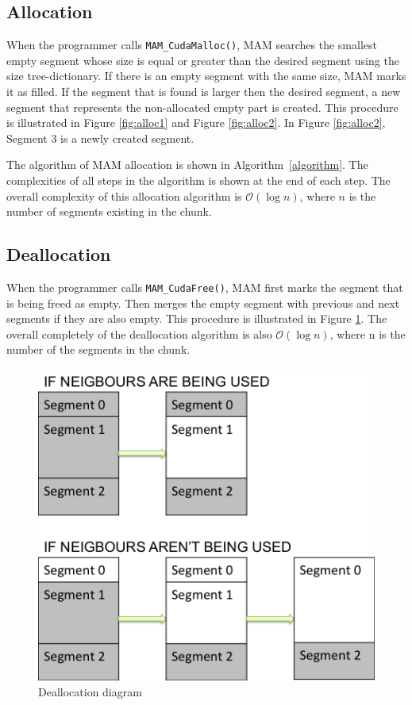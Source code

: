 \documentclass[conference]{IEEEtran}
\def\code#1{\texttt{#1}}
\begin{document}
\subsection{Allocation}
When the programmer calls \code{MAM\_CudaMalloc()}, MAM searches the smallest empty segment whose size is equal or greater than the desired segment using the size tree-dictionary. If there is an empty segment with the same size, MAM marks it as filled. If the segment that is found is larger then the desired segment, a new segment that represents the non-allocated empty part is created. This procedure is illustrated in Figure \ref{fig:alloc1} and Figure \ref{fig:alloc2}. In Figure \ref{fig:alloc2}, Segment 3 is a newly created segment. 




The algorithm of MAM allocation is shown in Algorithm~\ref{algorithm}. 
The complexities of all steps in the algorithm is shown at the end of each step. The overall complexity of this allocation algorithm is $\mathcal{O}(\log n)$, where $n$ is the number of segments existing in the chunk. 

          





\subsection{Deallocation}
When the programmer calls \code{MAM\_CudaFree()}, MAM first marks the segment that is being freed as empty. Then merges the empty segment with previous and next segments if they are also empty. This procedure is illustrated in Figure \ref{fig:dealloc}. %
The overall completely of the deallocation algorithm is also $\mathcal{O}(\log n)$, where n is the number of the segments in the chunk. 


\begin{figure}[h!]
\centering
  \includegraphics[width=0.75\linewidth]{deallocation/deallocation.png}
  \caption{Deallocation diagram}
  \label{fig:dealloc}
\end{figure}
\end{document}
